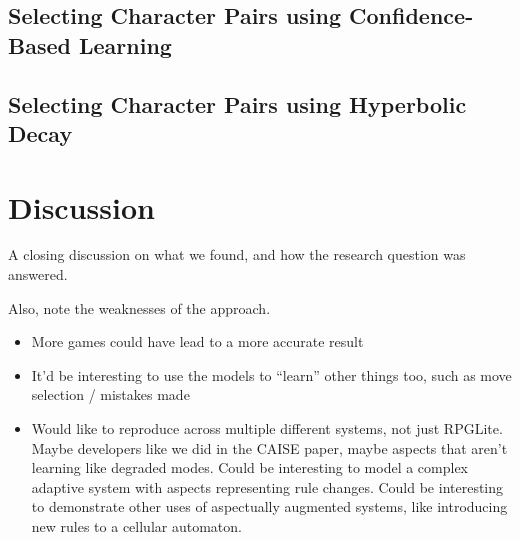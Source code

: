 



\subsection{Selecting Character Pairs using Confidence-Based Learning}





\subsection{Selecting Character Pairs using Hyperbolic Decay}




\section{Discussion}
\label{sec:optimisation_with_aspects_discussion}

A closing discussion on what we found, and how the research question was
answered.

Also, note the weaknesses of the approach.

\begin{itemize}
  \item More games could have lead to a more accurate result
  \item It'd be interesting to use the models to ``learn'' other things too,
    such as move selection / mistakes made
  \item Would like to reproduce across multiple different systems, not just
    RPGLite. Maybe developers like we did in the CAISE paper, maybe aspects that
    aren't learning like degraded modes. Could be interesting to model a complex
    adaptive system with aspects representing rule changes. Could be interesting
    to demonstrate other uses of aspectually augmented systems, like introducing
    new rules to a cellular automaton.
\end{itemize}